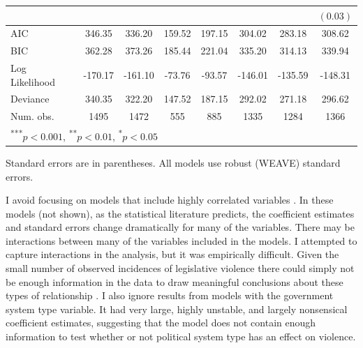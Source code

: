 \documentclass[a4paper]{article}\usepackage[]{graphicx}\usepackage[]{color}
\begin{document}
\begin{table}
\begin{center}
\begin{tabular}{l c c c c c c c }
                        &               &              &              &             &              &              & $(0.03)$    \\
\hline
AIC                     & 346.35        & 336.20       & 159.52       & 197.15      & 304.02       & 283.18       & 308.62      \\
BIC                     & 362.28        & 373.26       & 185.44       & 221.04      & 335.20       & 314.13       & 339.94      \\
Log Likelihood          & -170.17       & -161.10      & -73.76       & -93.57      & -146.01      & -135.59      & -148.31     \\
Deviance                & 340.35        & 322.20       & 147.52       & 187.15      & 292.02       & 271.18       & 296.62      \\
Num. obs.               & 1495          & 1472         & 555          & 885         & 1335         & 1284         & 1366        \\
\hline
\multicolumn{8}{l}{\scriptsize{\textsuperscript{***}$p<0.001$, 
  \textsuperscript{**}$p<0.01$, 
  \textsuperscript{*}$p<0.05$}}
\end{tabular}


\end{center}
{\scriptsize{
    Standard errors are in parentheses. All models use robust (WEAVE) standard errors. \\
}}
\end{table}

I avoid focusing on models that include highly correlated variables \citep[see][]{Achen2002, Schrodt2006}. In these models (not shown), as the statistical literature predicts, the coefficient estimates and standard errors change dramatically for many of the variables. There may be interactions between many of the variables included in the models. I attempted to capture interactions in the analysis, but it was empirically difficult. Given the small number of observed incidences of legislative violence there could simply not be enough information in the data to draw meaningful conclusions about these types of relationship \citep[see][]{Brambor2006}. I also ignore results from models with the government system type variable. It had very large, highly unstable, and largely nonsensical coefficient estimates, suggesting that the model does not contain enough information to test \citep{Babyak2004} whether or not political system type has an effect on violence.
\end{document}

